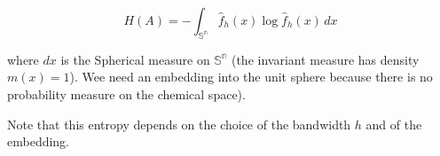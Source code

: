 \[ H(A) = -\int_\mathbb{{S}^n}  \hat{f}_h(x)\log  \hat{f}_h(x) \,dx  \]



where $dx$ is the Spherical measure on $\mathbb{{S}^n}$ (the invariant measure has density $m(x)=1$). Wee need an embedding into the unit sphere because there is no probability measure on the chemical space).

Note that this entropy depends on the choice of the bandwidth $h$ and of the embedding.
